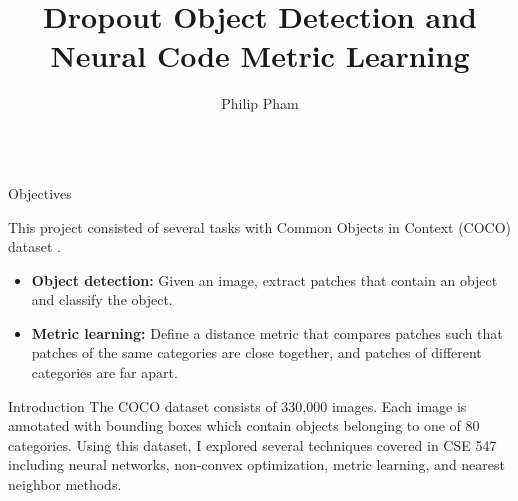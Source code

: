 \documentclass[final]{beamer}
\title{Dropout Object Detection and Neural Code Metric Learning}
\author{Philip Pham}
\institute{University of Washington}
\newlength{\onecolwid}
\begin{document}

\setlength\belowdisplayshortskip{2ex} %

\begin{frame}[t] %

\begin{columns}[t] %

\begin{column}{\onecolwid} %


  \begin{alertblock}{Objectives}

    This project consisted of several tasks with Common Objects in Context (COCO) dataset \citep{coco}.

    \begin{itemize}
    \item \textbf{Object detection:} Given an image, extract patches that contain an
      object and classify the object.
    \item \textbf{Metric learning:} Define a distance metric that compares patches such
      that patches of the same categories are close together, and patches of
      different categories are far apart.
    \end{itemize}
  \end{alertblock}


\begin{block}{Introduction}
  The COCO dataset consists of 330,000 images. Each image is annotated with
  bounding boxes which contain objects belonging to one of 80 categories. Using
  this dataset, I explored several techniques covered in CSE 547 including
  neural networks, non-convex optimization, metric learning, and nearest
  neighbor methods.


\end{block}
\end{column}
\end{columns}
\end{frame}
\end{document}
